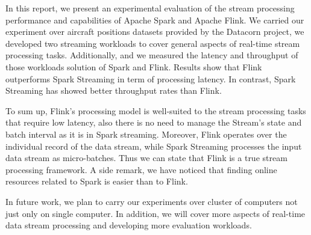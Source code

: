 \documentclass[]{article}
\begin{document}
In this report, we present an experimental evaluation of the stream processing performance and capabilities of Apache Spark and Apache Flink. We carried our experiment over aircraft positions datasets provided by the Datacorn project, we developed two streaming workloads to cover general aspects of real-time stream processing tasks. Additionally, and we measured the latency and throughput of those workloads solution of Spark and Flink. Results show that Flink outperforms Spark Streaming in term of processing latency. In contrast, Spark Streaming has showed better throughput rates than Flink. 
\par To sum up, Flink's processing model is well-suited to the stream processing tasks that require low latency, also there is no need to manage the Stream's state and batch interval as it is in Spark streaming. Moreover, Flink operates over the individual record of the data stream, while Spark Streaming  processes the input data stream as micro-batches. Thus we can state that  Flink is a true stream processing framework. A side remark, we have  noticed that finding online resources related to Spark is easier than to Flink.

In future work, we plan to carry our experiments over cluster of computers not just only on single computer. In addition, we will cover more aspects of real-time data stream processing and developing more evaluation workloads. 
\end{document}
